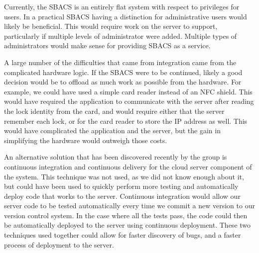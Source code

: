 \documentclass[12pt]{report}
\begin{document}
Currently, the SBACS is an entirely flat system with respect to privileges for users. In a practical SBACS having a
distinction for administrative users would likely be beneficial. This would require work on the server to support,
particularly if multiple levels of administrator were added. Multiple types of administrators would make sense for
providing SBACS as a service.

A large number of the difficulties that came from integration came from the complicated hardware logic. If the SBACS
were to be continued, likely a good decision would be to offload as much work as possible from the hardware. For
example, we could have used a simple card reader instead of an NFC shield. This would have required the application to
communicate with the server after reading the lock identity from the card, and would require either that the server
remember each lock, or for the card reader to store the IP address as well. This would have complicated the application
and the server, but the gain in simplifying the hardware would outweigh those costs.

An alternative solution that has been discovered recently by the group is continuous integration and continuous
delivery for the cloud server component of the system. This technique was not used, as we did not know enough about
it, but could have been used to quickly perform more testing and automatically deploy code that works to the server.
Continuous integration would allow our server code to be tested automatically every time we commit a new version to our
version control system. In the case where all the tests pass, the code could then be automatically deployed to the
server using continuous deployment. These two techniques used together could allow for faster discovery of bugs, and
a faster process of deployment to the server.


\printbibliography


\appendix


\end{document}
